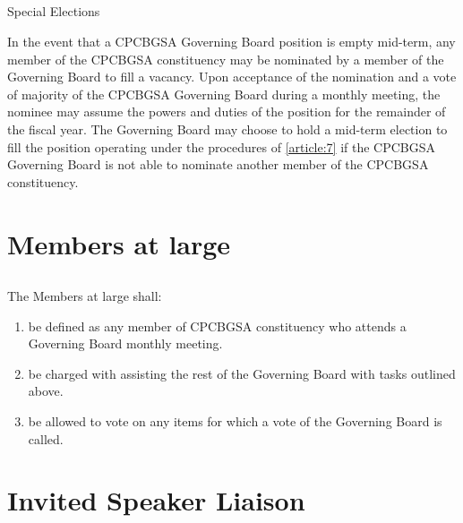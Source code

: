 \documentclass[11pt,a4paper]{article}
\begin{document}
\subsection{} Special Elections

In the event that a CPCBGSA Governing Board position is empty mid-term, any member of the CPCBGSA constituency may be nominated by a member of the Governing Board to fill a vacancy. Upon acceptance of the nomination and a vote of   majority of the CPCBGSA Governing Board during a monthly meeting, the nominee may assume the powers and duties of the position for the remainder of the fiscal year. The Governing Board may choose to hold a mid-term election to fill the position operating under the procedures of \cref{article:7} if the CPCBGSA Governing Board is not able to nominate another member of the CPCBGSA constituency.

\section{Members at large}\label{article:8}
\subsection{}The Members at large shall:
\begin{enumerate}        
    \item   be defined as any member of CPCBGSA constituency who attends a Governing Board monthly meeting.
	\item    be charged with assisting the rest of the Governing Board with tasks outlined above.
	\item    be allowed to vote on any items for which a vote of the Governing Board is called.
\end{enumerate}        

\section{Invited Speaker Liaison}\label{article:8}
\end{document}
